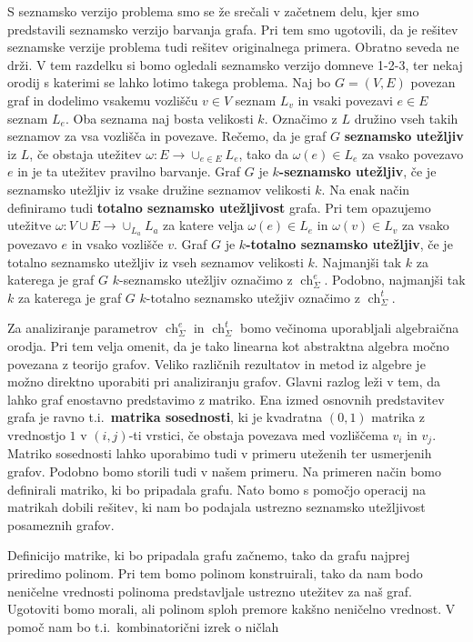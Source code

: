 \documentclass[12pt,a4paper,twoside]{article}
\theoremstyle{definition} %
\theoremstyle{plain} %
\newcommand{\ecl}{\ch_{\Sigma}^e}
\newcommand{\eclt}{\ch_{\Sigma}^t}
\numberwithin{equation}{section}  %
\DeclareMathOperator{\ch}{ch}
\begin{document}
S seznamsko verzijo problema smo se že srečali v začetnem delu, kjer smo predstavili seznamsko verzijo barvanja grafa. Pri tem smo ugotovili, da je rešitev seznamske verzije problema tudi rešitev originalnega primera. Obratno seveda ne drži. V tem razdelku si bomo ogledali seznamsko verzijo domneve 1-2-3,  ter nekaj orodij s katerimi se lahko lotimo takega problema. Naj bo $G = (V, E)$ povezan graf in dodelimo vsakemu vozlišču $v \in V$ seznam $L_v$ in vsaki povezavi $e \in E$ seznam  $L_e$. Oba seznama naj bosta velikosti $k$. Označimo z $L$ družino vseh takih seznamov za vsa vozlišča in povezave. Rečemo, da je graf $G$ \textbf{seznamsko utežljiv} iz $L$, če obstaja utežitev $\omega : E \rightarrow \cup_{e \in E} L_e$, tako da $\omega(e) \in L_e$ za vsako povezavo $e$ in je ta utežitev pravilno barvanje. Graf $G$ je  \textbf{$k$-seznamsko utežljiv}, če je seznamsko utežljiv iz vsake družine seznamov velikosti $k$. Na enak način definiramo tudi \textbf{totalno seznamsko utežljivost} grafa. Pri tem opazujemo utežitve $\omega : V \cup E \rightarrow \cup_{L_a} L_a$ za katere velja $\omega(e) \in L_e$ in $\omega(v) \in L_v$ za vsako povezavo $e$ in vsako vozlišče $v$. Graf $G$ je \textbf{$k$-totalno seznamsko utežljiv}, če je totalno seznamsko utežljiv iz vseh seznamov velikosti $k$. Najmanjši tak $k$ za katerega je graf $G$ $k$-seznamsko utežljiv označimo z $\ecl$. Podobno, najmanjši tak $k$ za katerega je graf $G$ $k$-totalno seznamsko utežjiv označimo z $\eclt$.

Za analiziranje parametrov $\ecl$ in $\eclt$ bomo večinoma uporabljali algebraična orodja. Pri tem velja omenit, da je tako linearna kot abstraktna algebra močno povezana z teorijo grafov. Veliko različnih rezultatov in metod iz algebre je možno direktno uporabiti pri analiziranju grafov. Glavni razlog leži v tem, da lahko graf enostavno predstavimo z matriko. Ena izmed osnovnih predstavitev grafa je ravno t.i.\ \textbf{matrika sosednosti}, ki je kvadratna $(0,1)$ matrika z vrednostjo $1$ v $(i,j)$-ti vrstici, če obstaja povezava med vozliščema $v_i$ in $v_j$. Matriko sosednosti lahko uporabimo tudi v primeru uteženih ter usmerjenih grafov. Podobno bomo storili tudi v našem primeru. Na primeren način bomo definirali matriko, ki bo pripadala grafu. Nato bomo s pomočjo operacij na matrikah dobili rešitev, ki nam bo podajala ustrezno seznamsko utežljivost posameznih grafov.

Definicijo matrike, ki bo pripadala grafu začnemo, tako da grafu najprej priredimo polinom. Pri tem bomo polinom konstruirali, tako da nam bodo neničelne vrednosti polinoma predstavljale ustrezno utežitev za naš graf. Ugotoviti bomo morali, ali polinom sploh premore kakšno neničelno vrednost. V pomoč nam bo t.i.\ kombinatorični izrek o ničlah
\end{document}
